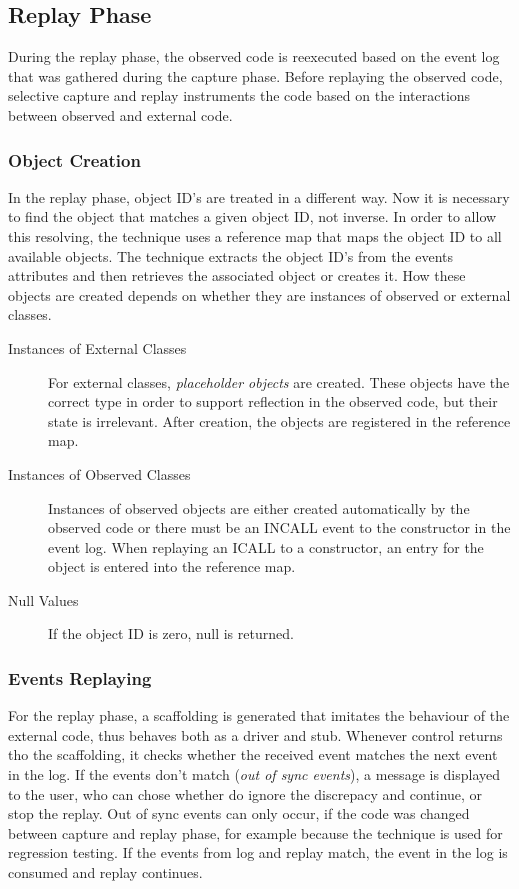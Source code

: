 \subsection{Replay Phase}
During the replay phase, the observed code is reexecuted based on the event log that was gathered during the capture phase. Before replaying the observed code, selective capture and replay instruments the code based on the interactions between observed and external code. 

\subsubsection{Object Creation}
In the replay phase, object ID's are treated in a different way. Now it is necessary to find the object that matches a given object ID, not inverse. In order to allow this resolving, the technique uses a reference map that maps the object ID to all available  objects. The technique extracts the object ID's from the events attributes and then retrieves the associated object or creates it. How these objects are created depends on whether they are instances of observed or external classes.
\begin{description}
 \item [Instances of External Classes] For external classes, \emph{placeholder objects} are created. These objects have the correct type in order to support reflection in the observed code, but their state is irrelevant. After creation, the objects are registered in the reference map.  %
 \item [Instances of Observed Classes] Instances of observed objects are either created automatically by the observed code or there must be an INCALL event to the constructor in the event log. When replaying an ICALL to a constructor, an entry for the object is entered into the reference map.
 \item [Null Values] If the object ID is zero, null is returned.
\end{description}

\subsubsection{Events Replaying}
For the replay phase, a scaffolding is generated that imitates the behaviour of the external code, thus behaves both as a driver and stub. Whenever control returns tho the scaffolding, it checks whether the received event matches the next event in the log. If the events don't match (\emph{out of sync events}), a message is displayed to the user, who can chose whether do ignore the discrepacy and continue, or stop the replay.  Out of sync events can only occur, if the code was changed between capture and replay phase, for example because the technique is used for regression testing. If the events from log and replay match, the event in the log is  consumed and replay continues.


